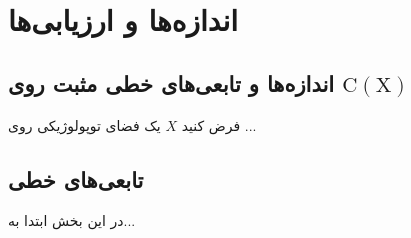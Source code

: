 \chapter{اندازه‌ها و ارزیابی‌ها}
\section{اندازه‌ها و تابعی‌های خطی مثبت روی $\mathrm{C(X)}$}
فرض کنید $X$ یک فضای توپولوژیکی روی ...
\section{تابعی‌های خطی}
در این بخش ابتدا به...